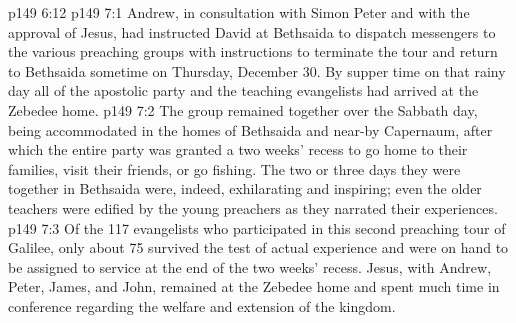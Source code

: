 \vs p149 6:12 
\vs p149 7:1 Andrew, in consultation with Simon Peter and with the approval of Jesus, had instructed David at Bethsaida to dispatch messengers to the various preaching groups with instructions to terminate the tour and return to Bethsaida sometime on Thursday, December 30. By supper time on that rainy day all of the apostolic party and the teaching evangelists had arrived at the Zebedee home.
\vs p149 7:2 The group remained together over the Sabbath day, being accommodated in the homes of Bethsaida and near\hyp{}by Capernaum, after which the entire party was granted a two weeks’ recess to go home to their families, visit their friends, or go fishing. The two or three days they were together in Bethsaida were, indeed, exhilarating and inspiring; even the older teachers were edified by the young preachers as they narrated their experiences.
\vs p149 7:3 Of the 117 evangelists who participated in this second preaching tour of Galilee, only about 75 survived the test of actual experience and were on hand to be assigned to service at the end of the two weeks’ recess. Jesus, with Andrew, Peter, James, and John, remained at the Zebedee home and spent much time in conference regarding the welfare and extension of the kingdom.
\quizlink
